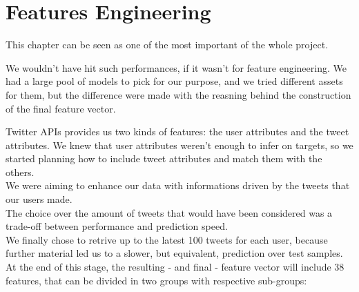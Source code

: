 \chapter{Features Engineering}
\label{capitolo4}
\thispagestyle{empty}

This chapter can be seen as one of the most important of the whole project.

We wouldn't have hit such performances, if it wasn't for feature engineering. We had a large pool of models to pick for our purpose,  and we tried different assets for them, but the difference were made with the reasning behind the construction of the final feature vector.

Twitter APIs provides us two kinds of features: the user attributes and the tweet attributes.
We knew that user attributes weren't enough to infer on targets, so we started planning how to include tweet attributes and match them with the others.\\
We were aiming to enhance our data with informations driven by the tweets that our users made.\\
The choice over the amount of tweets that would have been considered was a trade-off between performance and prediction speed.\\
We finally chose to retrive up to the latest 100 tweets for each user, because further material led us to a slower, but equivalent, prediction over test samples.\\
At the end of this stage, the resulting - and final - feature vector will include 38 features, that can be divided in two groups with respective sub-groups:
\small
